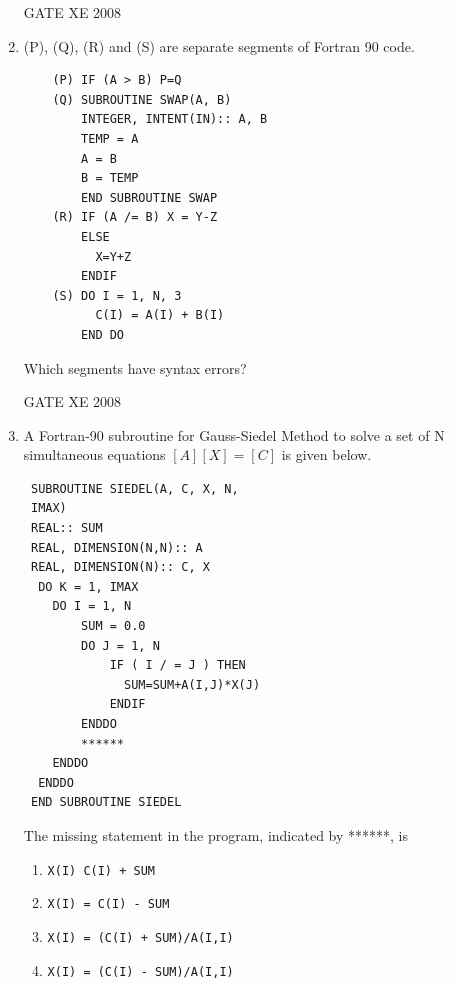 \documentclass[12pt]{article}
\begin{document}
\begin{enumerate}
\begin{table}[H]
\begin{tabular}{ll}
\end{tabular} \end{table}

GATE XE 2008
\item (P), (Q), (R) and (S) are separate segments of Fortran 90 code.
\begin{verbatim}
    (P) IF (A > B) P=Q
    (Q) SUBROUTINE SWAP(A, B)
        INTEGER, INTENT(IN):: A, B
        TEMP = A
        A = B
        B = TEMP
        END SUBROUTINE SWAP
    (R) IF (A /= B) X = Y-Z
        ELSE
          X=Y+Z
        ENDIF
    (S) DO I = 1, N, 3
          C(I) = A(I) + B(I)
        END DO
\end{verbatim}

Which segments have syntax errors?

\begin{enumerate}
\end{enumerate}

GATE XE 2008
\item A Fortran-90 subroutine for Gauss-Siedel Method to solve a set of N simultaneous equations $[A][X]=[C]$ is given below.
\begin{verbatim}
 SUBROUTINE SIEDEL(A, C, X, N,
 IMAX)
 REAL:: SUM
 REAL, DIMENSION(N,N):: A
 REAL, DIMENSION(N):: C, X
  DO K = 1, IMAX
    DO I = 1, N
        SUM = 0.0
        DO J = 1, N
            IF ( I / = J ) THEN
              SUM=SUM+A(I,J)*X(J)
            ENDIF
        ENDDO
        ******
    ENDDO
  ENDDO
 END SUBROUTINE SIEDEL
\end{verbatim}

The missing statement in the program, indicated by ******, is

\begin{enumerate}
\item  \texttt{X(I) C(I) + SUM}

\item  \texttt{X(I) = C(I) - SUM}

\item  \texttt{X(I) = (C(I) + SUM)/A(I,I)}

\item  \texttt{X(I) = (C(I) - SUM)/A(I,I)}
\end{enumerate}


\end{enumerate}
\end{document}
